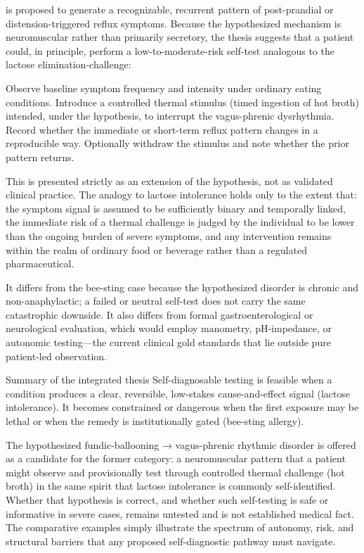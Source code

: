 is proposed to generate a recognizable, recurrent pattern of post-prandial or distension-triggered reflux symptoms. Because the hypothesized mechanism is neuromuscular rather than primarily secretory, the thesis suggests that a patient could, in principle, perform a low-to-moderate-risk self-test analogous to the lactose elimination-challenge:

Observe baseline symptom frequency and intensity under ordinary eating conditions.  
Introduce a controlled thermal stimulus (timed ingestion of hot broth) intended, under the hypothesis, to interrupt the vagus-phrenic dysrhythmia.  
Record whether the immediate or short-term reflux pattern changes in a reproducible way.  
Optionally withdraw the stimulus and note whether the prior pattern returns.

This is presented strictly as an extension of the hypothesis, not as validated clinical practice. The analogy to lactose intolerance holds only to the extent that:
the symptom signal is assumed to be sufficiently binary and temporally linked,  
the immediate risk of a thermal challenge is judged by the individual to be lower than the ongoing burden of severe symptoms, and  
any intervention remains within the realm of ordinary food or beverage rather than a regulated pharmaceutical.

It differs from the bee-sting case because the hypothesized disorder is chronic and non-anaphylactic; a failed or neutral self-test does not carry the same catastrophic downside. It also differs from formal gastroenterological or neurological evaluation, which would employ manometry, pH-impedance, or autonomic testing—the current clinical gold standards that lie outside pure patient-led observation.

Summary of the integrated thesis
Self-diagnosable testing is feasible when a condition produces a clear, reversible, low-stakes cause-and-effect signal (lactose intolerance). It becomes constrained or dangerous when the first exposure may be lethal or when the remedy is institutionally gated (bee-sting allergy).  

The hypothesized fundic-ballooning → vagus-phrenic rhythmic disorder is offered as a candidate for the former category: a neuromuscular pattern that a patient might observe and provisionally test through controlled thermal challenge (hot broth) in the same spirit that lactose intolerance is commonly self-identified. Whether that hypothesis is correct, and whether such self-testing is safe or informative in severe cases, remains untested and is not established medical fact. The comparative examples simply illustrate the spectrum of autonomy, risk, and structural barriers that any proposed self-diagnostic pathway must navigate.
